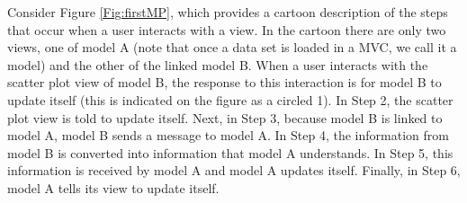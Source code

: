 \documentclass[11pt]{article}
\newcommand{\Robject}[1]{{\texttt{#1}}}
\begin{document}
Consider Figure \ref{Fig:firstMP}, which provides a cartoon
description of the steps that occur when a user interacts with a
view.  In the cartoon there are only two views, one of model A (note 
that once a data set is loaded in a MVC, we call it a model) and the
other of the linked model B.  When a user
interacts with the scatter plot view of model B, the response to
this interaction is for model B to update itself (this is indicated
on the figure as a circled 1).  In Step 2, the scatter plot view is
told to update itself.  Next, in Step 3, because model B is linked
to model A, model B sends a message to model A.  In Step 4,
the information from model B is converted into information that
model A understands.  In Step 5, this information is received by
model A and model A updates itself.  Finally, in Step 6, model
A tells its view to update itself.


\end{document}
